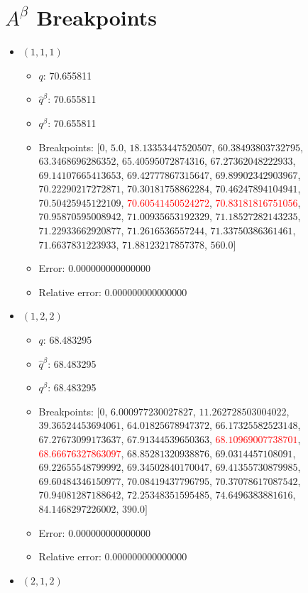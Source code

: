 \documentclass{article}%
\begin{document}
\section{$A^\beta$ Breakpoints}%
\thispagestyle{plain}%
\begin{itemize}%
	\item $(1, 1, 1)$%
	\begin{itemize}%
		\item $q$: 70.655811%
		\item $\hat{q}^\beta$: 70.655811%
		\item $q^\beta$: 70.655811%
		\item Breakpoints: $[$$0$, $5.0$, $18.13353447520507$, $60.38493803732795$, $63.3468696286352$, $65.40595072874316$, $67.27362048222933$, $69.14107665413653$, $69.42777867315647$, $69.89902342903967$, $70.22290217272871$, $70.30181758862284$, $70.46247894104941$, $70.50425945122109$, \textcolor{red}{$70.60541450524272$}, \textcolor{red}{$70.83181816751056$}, $70.95870595008942$, $71.00935653192329$, $71.18527282143235$, $71.22933662920877$, $71.2616536557244$, $71.33750386361461$, $71.6637831223933$, $71.88123217857378$, $560.0$$]$%
		\item Error: 0.000000000000000%
		\item Relative error: 0.000000000000000%
	\end{itemize}%
	\item $(1, 2, 2)$%
	\begin{itemize}%
		\item $q$: 68.483295%
		\item $\hat{q}^\beta$: 68.483295%
		\item $q^\beta$: 68.483295%
		\item Breakpoints: $[$$0$, $6.000977230027827$, $11.262728503004022$, $39.36524453694061$, $64.01825678947372$, $66.17325582523148$, $67.27673099173637$, $67.91344539650363$, \textcolor{red}{$68.10969007738701$}, \textcolor{red}{$68.66676327863097$}, $68.85281320938876$, $69.0314457108091$, $69.22655548799992$, $69.34502840170047$, $69.41355730879985$, $69.60484346150977$, $70.08419437796795$, $70.37078617087542$, $70.94081287188642$, $72.25348351595485$, $74.6496383881616$, $84.1468297226002$, $390.0$$]$%
		\item Error: 0.000000000000000%
		\item Relative error: 0.000000000000000%
	\end{itemize}%
	\item $(2, 1, 2)$%
	\begin{itemize}%

\end{itemize}
\end{itemize}
\end{document}
